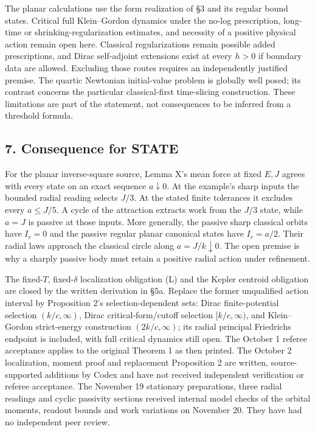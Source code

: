 \documentclass[11pt,a4paper]{article}
\begin{document}
The planar calculations use the form realization of §3 and its regular
bound states. Critical full Klein--Gordon dynamics under the no-log
prescription, long-time or shrinking-regularization estimates, and
necessity of a positive physical action remain open here. Classical
regularizations remain possible added prescriptions, and Dirac
self-adjoint extensions exist at every \(h>0\) if boundary data are
allowed. Excluding those routes requires an independently justified
premise. The quartic Newtonian initial-value problem is globally well
posed; its contrast concerns the particular classical-first time-slicing
construction. These limitations are part of the statement, not
consequences to be inferred from a threshold formula.

\subsection{7. Consequence for STATE}\label{consequence-for-state}

For the planar inverse-square source, Lemma X's mean force at fixed
\(E,J\) agrees with every state on an exact sequence \(a\downarrow0\).
At the example's sharp inputs the bounded radial reading selects
\(J/3\). At the stated finite tolerances it excludes every \(a\le J/5\).
A cycle of the attraction extracts work from the \(J/3\) state, while
\(a=J\) is passive at those inputs. More generally, the passive sharp
classical orbits have \(I_r=0\) and the passive regular planar canonical
states have \(I_r=a/2\). Their radial laws approach the classical circle
along \(a=J/k\downarrow0\). The open premise is why a sharply passive
body must retain a positive radial action under refinement.

The fixed-\(T\), fixed-\(\delta\) localization obligation (L) and the
Kepler centroid obligation are closed by the written derivation in §5a.
Replace the former unqualified action interval by Proposition 2's
selection-dependent sets: Dirac finite-potential selection
\((k/c,\infty)\), Dirac critical-form/cutoff selection \([k/c,\infty)\),
and Klein--Gordon strict-energy construction \((2k/c,\infty)\); its
radial principal Friedrichs endpoint is included, with full critical
dynamics still open. The October 1 referee acceptance applies to the
original Theorem 1 as then printed. The October 2 localization, moment
proof and replacement Proposition 2 are written, source-supported
additions by Codex and have not received independent verification or
referee acceptance. The November 19 stationary preparations, three
radial readings and cyclic passivity sections received internal model
checks of the orbital moments, readout bounds and work variations on
November 20. They have had no independent peer review.
\end{document}

